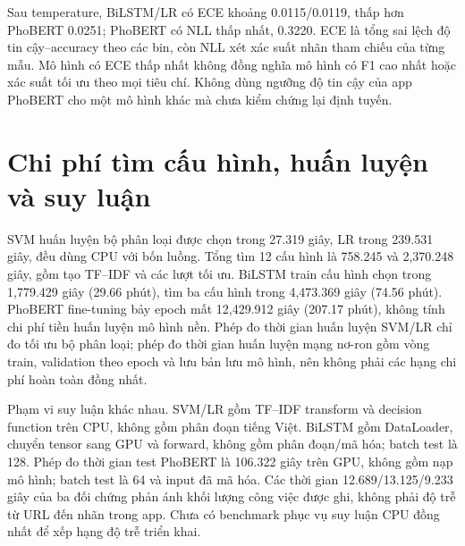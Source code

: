 Sau temperature, BiLSTM/LR có ECE khoảng 0.0115/0.0119, thấp hơn PhoBERT 0.0251; PhoBERT có NLL thấp nhất, 0.3220. ECE là tổng sai lệch độ tin cậy--accuracy theo các bin, còn NLL xét xác suất nhãn tham chiếu của từng mẫu. Mô hình có ECE thấp nhất không đồng nghĩa mô hình có F1 cao nhất hoặc xác suất tối ưu theo mọi tiêu chí. Không dùng ngưỡng độ tin cậy của app PhoBERT cho một mô hình khác mà chưa kiểm chứng lại định tuyến.

\section{Chi phí tìm cấu hình, huấn luyện và suy luận}
SVM huấn luyện bộ phân loại được chọn trong 27.319 giây, LR trong 239.531 giây, đều dùng CPU với bốn luồng. Tổng tìm 12 cấu hình là 758.245 và 2,370.248 giây, gồm tạo TF--IDF và các lượt tối ưu. BiLSTM train cấu hình chọn trong 1,779.429 giây (29.66 phút), tìm ba cấu hình trong 4,473.369 giây (74.56 phút). PhoBERT fine-tuning bảy epoch mất 12,429.912 giây (207.17 phút), không tính chi phí tiền huấn luyện mô hình nền. Phép đo thời gian huấn luyện SVM/LR chỉ đo tối ưu bộ phân loại; phép đo thời gian huấn luyện mạng nơ-ron gồm vòng train, validation theo epoch và lưu bản lưu mô hình, nên không phải các hạng chi phí hoàn toàn đồng nhất.

Phạm vi suy luận khác nhau. SVM/LR gồm TF--IDF transform và decision function trên CPU, không gồm phân đoạn tiếng Việt. BiLSTM gồm DataLoader, chuyển tensor sang GPU và forward, không gồm phân đoạn/mã hóa; batch test là 128. Phép đo thời gian test PhoBERT là 106.322 giây trên GPU, không gồm nạp mô hình; batch test là 64 và input đã mã hóa. Các thời gian 12.689/13.125/9.233 giây của ba đối chứng phản ánh khối lượng công việc được ghi, không phải độ trễ từ URL đến nhãn trong app. Chưa có benchmark phục vụ suy luận CPU đồng nhất để xếp hạng độ trễ triển khai.

